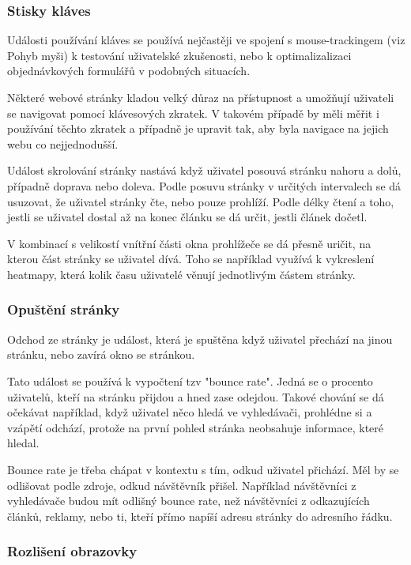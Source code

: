 \documentclass[bc,male,java,dept456]{diploma}						%
\begin{document}
\subsubsection{Stisky kláves}

Události používání kláves se používá nejčastěji ve spojení s mouse-trackingem (viz Pohyb myši) k testování uživatelské zkušenosti, nebo k optimalizalizaci objednávkových formulářů v podobných situacích.

Některé webové stránky kladou velký důraz na přístupnost a umožňují uživateli se navigovat pomocí klávesových zkratek. V takovém případě by měli měřit i používání těchto zkratek a případně je upravit tak, aby byla navigace na jejich webu co nejjednodušší.




Událost skrolování stránky nastává když uživatel posouvá stránku nahoru a dolů, případně doprava nebo doleva. Podle  posuvu stránky v určitých intervalech se dá usuzovat, že uživatel stránky čte, nebo pouze prohlíží. Podle délky čtení a toho, jestli se uživatel dostal až na konec článku se dá určit, jestli článek dočetl.

V kombinací s velikostí vnítřní části okna prohlížeče se dá přesně uričit, na kterou část stránky se uživatel dívá. Toho se například využívá k vykreslení heatmapy, která kolik času uživatelé věnují jednotlivým částem stránky. 


\subsubsection{Opuštění stránky}
Odchod ze stránky je událost, která je spuštěna když uživatel přechází na jinou stránku, nebo zavírá okno se stránkou. 

Tato událost se používá k vypočtení tzv "bounce rate". Jedná se o procento uživatelů, kteří na stránku přijdou a hned zase odejdou. Takové chování se dá očekávat například, když uživatel něco hledá ve vyhledávači, prohlédne si a vzápětí odchází, protože na první pohled stránka neobsahuje informace, které hledal.

Bounce rate je třeba chápat v kontextu s tím, odkud uživatel přichází. Měl by se odlišovat podle zdroje, odkud návštěvník přišel. Například návštěvníci z vyhledávače budou mít odlišný bounce rate, než návštěvníci z odkazujících článků, reklamy, nebo ti, kteří přímo napíší adresu stránky do adresního řádku.

\subsubsection{Rozlišení obrazovky}
\end{document}
